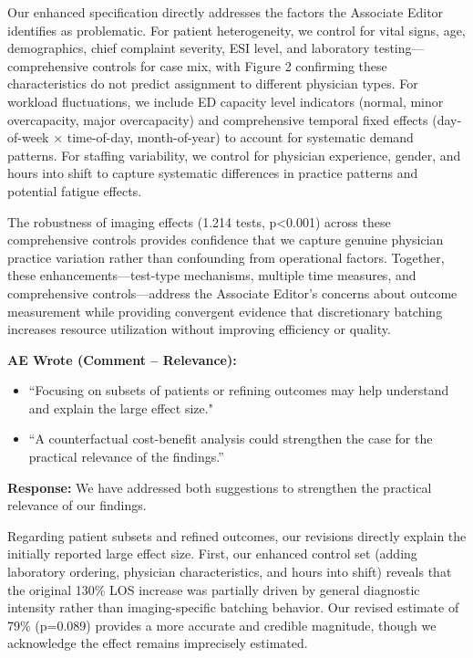\documentclass[11pt]{article}
\newenvironment{quote2}
{ \bigskip
\noindent
         \small\em
         \baselineskip=14pt
}
\newcommand{\1}{\hbox{\rm 1\kern-.35em 1}}
\begin{document}
Our enhanced specification directly addresses the factors the Associate Editor identifies as problematic. For patient heterogeneity, we control for vital signs, age, demographics, chief complaint severity, ESI level, and laboratory testing—comprehensive controls for case mix, with Figure 2 confirming these characteristics do not predict assignment to different physician types. For workload fluctuations, we include ED capacity level indicators (normal, minor overcapacity, major overcapacity) and comprehensive temporal fixed effects (day-of-week × time-of-day, month-of-year) to account for systematic demand patterns. For staffing variability, we control for physician experience, gender, and hours into shift to capture systematic differences in practice patterns and potential fatigue effects.

The robustness of imaging effects (1.214 tests, p<0.001) across these comprehensive controls provides confidence that we capture genuine physician practice variation rather than confounding from operational factors. Together, these enhancements—test-type mechanisms, multiple time measures, and comprehensive controls—address the Associate Editor's concerns about outcome measurement while providing convergent evidence that discretionary batching increases resource utilization without improving efficiency or quality.
\color{black}

\begin{quote2}
\textbf{AE Wrote (Comment – Relevance):} 

\begin{itemize}
    \item ``Focusing on subsets of patients or refining outcomes may help understand and explain the large effect size."
    \item ``A counterfactual cost-benefit analysis could strengthen the case for the practical relevance of the findings.” 
\end{itemize}

\end{quote2}

\noindent\textbf{Response:} \color{blue}We have addressed both suggestions to strengthen the practical relevance of our findings.

Regarding patient subsets and refined outcomes, our revisions directly explain the initially reported large effect size. First, our enhanced control set (adding laboratory ordering, physician characteristics, and hours into shift) reveals that the original 130\% LOS increase was partially driven by general diagnostic intensity rather than imaging-specific batching behavior. Our revised estimate of 79\% (p=0.089) provides a more accurate and credible magnitude, though we acknowledge the effect remains imprecisely estimated.
\end{document}
